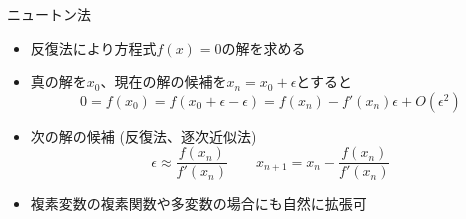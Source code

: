 \begin{frame}[t,fragile]{ニュートン法}
  \begin{itemize}
    \setlength{\itemsep}{1em}
  \item 反復法により方程式$f(x)=0$の解を求める
  \item 真の解を$x_0$、現在の解の候補を$x_n=x_0+\epsilon$とすると
    \[
    0 = f(x_0) = f(x_0+\epsilon-\epsilon) = f(x_n) - f'(x_n) \epsilon + O(\epsilon^2)
    \]
  \item 次の解の候補 (反復法、逐次近似法)
    \[
    \epsilon \approx \frac{f(x_n)}{f'(x_n)} \quad\quad x_{n+1} = x_n - \frac{f(x_n)}{f'(x_n)}
    \]
  \item 複素変数の複素関数や多変数の場合にも自然に拡張可
  \end{itemize}
\end{frame}

